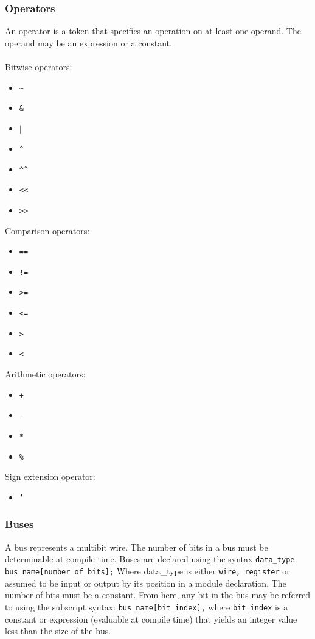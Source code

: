 \documentclass[letterpaper,11pt]{article}
\begin{document}
        \subsubsection{Operators}
        An operator is a token that specifies an operation on at least one operand. The operand 
        may be an expression or a constant. \\\\
        Bitwise operators:
        \begin{itemize}
        \item{\texttt{\~}} 
        \item{\texttt{\& }}
        \item{\texttt{$\mid$}}
        \item{\texttt{\^}}
        \item{\texttt{\~\^}} 
        \item{\texttt{<<}} 
        \item{\texttt{>>}}
        \end{itemize}
        Comparison operators: 
        \begin{itemize}
        \item{\texttt{==}}
        \item{\texttt{!=}}
        \item{\texttt{>= }}
        \item{\texttt{<= }}
        \item{\texttt{> }}
        \item{\texttt{<}}
        \end{itemize}
        Arithmetic operators: 
        \begin{itemize}
        \item{\texttt{+}}
        \item{\texttt{- }}
        \item{\texttt{* }}
        \item{\texttt{\%}} 
        \end{itemize}
        Sign extension operator: 
        \begin{itemize}
        \item{\texttt{'}}
        \end{itemize}
        \subsubsection{Buses}
        A bus represents a multibit wire. The number of bits in a bus must be determinable at compile 
        time. Buses are declared using the syntax \texttt{data\_type bus\_name[number\_of\_bits];} Where 
        data\_type is either \texttt{wire, register} or assumed to be input or output by its position in a module 
        declaration. The number of bits must be a constant. From here, any bit in the bus may be referred 
        to using the subscript syntax: \texttt{bus\_name[bit\_index],} where \texttt{bit\_index} is a constant or expression (evaluable at compile time) that yields an integer value less than the size of the bus. 
        
\end{document}
